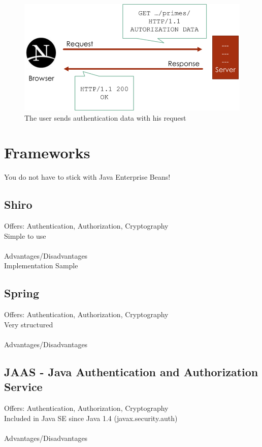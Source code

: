 \documentclass[12pt,a4paper,draft]{report}
\begin{document}
\begin{figure}[h!]
	\centering
	\includegraphics[width=1\linewidth]{res/Authorized}
	\caption{The user sends authentication data with his request}
	\label{fig:Authorized}
\end{figure}

\section{Frameworks}
You do not have to stick with Java Enterprise Beans!\\

\subsection{Shiro}
Offers: Authentication, Authorization, Cryptography\\
Simple to use\\\\
Advantages/Disadvantages\\
Implementation Sample

\subsection{Spring}
Offers: Authentication, Authorization, Cryptography\\
Very structured\\\\
Advantages/Disadvantages\\

\subsection{JAAS - Java Authentication and Authorization Service}
Offers: Authentication, Authorization, Cryptography\\
Included in Java SE since Java 1.4 (javax.security.auth)\\\\
Advantages/Disadvantages\\
\end{document}
